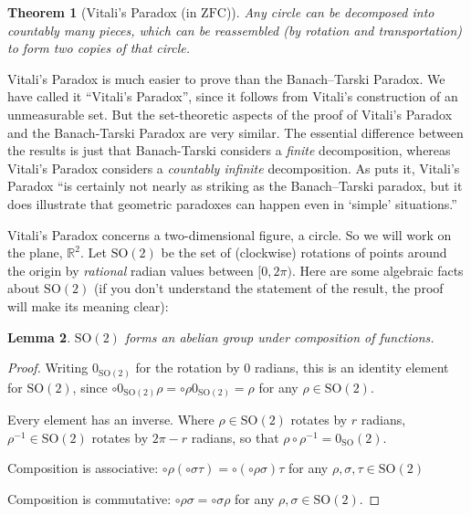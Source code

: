 \documentclass[10pt,a4paper]{article}
\theoremstyle{plain}
\newtheorem{thm}{Theorem}[section]
\newtheorem{lem}[thm]{Lemma}
\theoremstyle{definition}
\theoremstyle{remark}
\newcommand*{\ollabel}[1]{\label{#1}}
\providecommand{\rotationsgroup}{\mathrm{SO}(2)}
\providecommand{\ZFC}{\mathrm{ZFC}}
\providecommand{\Real}{\mathbb{R}}
\providecommand{\comp}{\circ}
\providecommand{\citet}[1]{\cite{#1}}
\providecommand{\citeyear}[1]{\cite{#1}}
\begin{document}
\begin{thm}[Vitali's Paradox (in $\ZFC$)]\ollabel{vitaliparadox}
Any circle can be decomposed into countably many pieces, which can be
reassembled (by rotation and transportation) to form two copies of
that circle.
\end{thm}

Vitali's Paradox is much easier to prove than the Banach--Tarski Paradox. We have
called it ``Vitali's Paradox'', since it follows from Vitali's
\citeyear{Vitali1905} construction of an unmeasurable set.  But the
set-theoretic aspects of the proof of Vitali's Paradox and the
Banach-Tarski Paradox are very similar. The essential difference
between the results is just that Banach-Tarski considers a
\emph{finite} decomposition, whereas Vitali's Paradox considers a
\emph{countably infinite} decomposition.  As \citet{Weston2003}
puts it, Vitali's Paradox ``is certainly not nearly as striking as the
Banach--Tarski paradox, but it does illustrate that geometric
paradoxes can  happen even in `simple' situations.'' 

Vitali's Paradox concerns a two-dimensional figure, a circle. So we
will work on the plane, $\Real^2$. Let $\rotationsgroup$ be the set of
(clockwise) rotations of points around the origin by \emph{rational}
radian values between $[0,2\pi)$. Here are some algebraic facts about
$\rotationsgroup$ (if you don't understand the statement of the
result, the proof will make its meaning clear):

\begin{lem}\ollabel{rotationsgroupabelian}
$\rotationsgroup$ forms an abelian {group} under composition of functions.
\end{lem}

\begin{proof}
Writing $0_{\rotationsgroup}$ for the rotation by $0$ radians, this is
an identity element for $\rotationsgroup$, since
$\comp{0_{\rotationsgroup}}{\rho} = \comp{\rho}{0_{\rotationsgroup}} =
\rho$ for any $\rho \in \rotationsgroup$.

Every element has an inverse. Where $\rho \in \rotationsgroup$ rotates
by $r$ radians, $\rho^{-1} \in \rotationsgroup$ rotates by $2\pi - r$
radians, so that $\rho \circ \rho^{-1} = 0_\rotationsgroup$.

Composition is associative: $\comp{\rho}{(\comp{\sigma}{\tau})} =
\comp{(\comp{\rho}{\sigma})}{\tau}$ for any $\rho, \sigma, \tau \in
\rotationsgroup$

Composition is commutative: $\comp{\rho}{\sigma} =
\comp{\sigma}{\rho}$ for any $\rho, \sigma \in \rotationsgroup$.
\end{proof}
\end{document}

